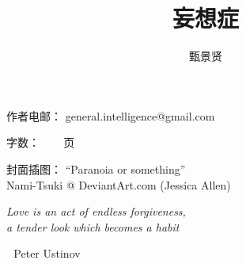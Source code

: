 \documentclass[12pt]{report}
\newcommand{\tab}{\hspace*{1cm}}
\newcommand*\dashh{\,\,\textemdash\kern-1pt\textemdash\,\,}
\begin{document}

\cleardoublepage
\title{\Huge{妄想症}}
\author{甄景贤}



\FPsub\resulta{\thedatezero}{\thedateone}
\FPdiv{}
\FPround{}

\FPsub\resultc{\thedatezero}{\thedatetwo}
\FPdiv{}
\FPround{}

\large

{\let\newpage\relax\maketitle}

\maketitle
\setlength{\parindent}{0em}
\setlength{\parskip}{2.8ex}

\small

\begin{center}

作者电邮： general.intelligence@gmail.com

字数：   ~~~\pageref*{LastPage} 页

封面插图：  ``Paranoia or something'' \\
Nami-Tsuki @ DeviantArt.com (Jessica Allen)
\end{center}
\large

\newpage
{}

\tab\tab\tab \parbox{9cm}{\textit{Love is an act of endless forgiveness,\\
a tender look which becomes a habit}}
\vspace{0.5cm}
\begin{flushright}
\dashh Peter Ustinov \hspace*{3cm}
\end{flushright}
\end{document}
